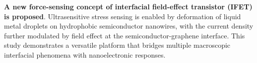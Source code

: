 \documentclass[12pt]{article}
\begin{document}
 {\bfseries A new force-sensing concept of interfacial
  field-effect transistor (IFET) is proposed}. Ultrasensitive stress
sensing is enabled by deformation of liquid metal droplets on
hydrophobic semiconductor nanowires, with the current density further
modulated by field effect at the semiconductor-graphene
interface. This study demonstrates a versatile platform that bridges
multiple macroscopic interfacial phenomena with nanoelectronic
responses.
\end{document}
